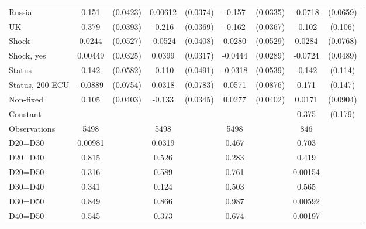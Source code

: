 \begin{tabular}{l|cccccc|cc}
Russia        &    0.151\sym{***}& (0.0423)&  0.00612         & (0.0374)&   -0.157\sym{***}& (0.0335)&  -0.0718         & (0.0659)\\
UK            &    0.379\sym{***}& (0.0393)&   -0.216\sym{***}& (0.0369)&   -0.162\sym{***}& (0.0367)&   -0.102         &  (0.106)\\
Shock         &   0.0244         & (0.0527)&  -0.0524         & (0.0408)&   0.0280         & (0.0529)&   0.0284         & (0.0768)\\
Shock, yes    &  0.00449         & (0.0325)&   0.0399         & (0.0317)&  -0.0444         & (0.0289)&  -0.0724         & (0.0489)\\
Status        &    0.142\sym{**} & (0.0582)&   -0.110\sym{**} & (0.0491)&  -0.0318         & (0.0539)&   -0.142         &  (0.114)\\
Status, 200 ECU&  -0.0889         & (0.0754)&   0.0318         & (0.0783)&   0.0571         & (0.0876)&    0.171         &  (0.147)\\
Non-fixed     &    0.105\sym{***}& (0.0403)&   -0.133\sym{***}& (0.0345)&   0.0277         & (0.0402)&   0.0171         & (0.0904)\\
Constant        &                  &         &                  &         &                  &         &    0.375\sym{**} &  (0.179)\\
\hline
Observations    &     5498         &         &     5498         &         &     5498         &         &      846         &         \\
D20=D30         &  0.00981         &         &   0.0319         &         &    0.467         &         &    0.703         &         \\
D20=D40         &    0.815         &         &    0.526         &         &    0.283         &         &    0.419         &         \\
D20=D50         &    0.316         &         &    0.589         &         &    0.761         &         &  0.00154         &         \\
D30=D40         &    0.341         &         &    0.124         &         &    0.503         &         &    0.565         &         \\
D30=D50         &    0.849         &         &    0.866         &         &    0.987         &         &  0.00592         &         \\
D40=D50         &    0.545         &         &    0.373         &         &    0.674         &         &  0.00197         &         \\

\end{tabular}
